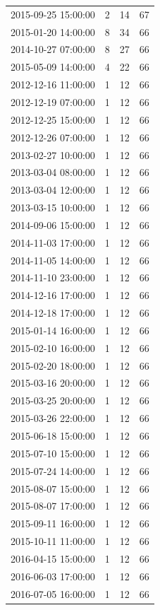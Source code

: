 \begin{tabular}{lrrr}
2015-09-25 15:00:00 & 2 & 14 & 67 \\
2015-01-20 14:00:00 & 8 & 34 & 66 \\
2014-10-27 07:00:00 & 8 & 27 & 66 \\
2015-05-09 14:00:00 & 4 & 22 & 66 \\
2012-12-16 11:00:00 & 1 & 12 & 66 \\
2012-12-19 07:00:00 & 1 & 12 & 66 \\
2012-12-25 15:00:00 & 1 & 12 & 66 \\
2012-12-26 07:00:00 & 1 & 12 & 66 \\
2013-02-27 10:00:00 & 1 & 12 & 66 \\
2013-03-04 08:00:00 & 1 & 12 & 66 \\
2013-03-04 12:00:00 & 1 & 12 & 66 \\
2013-03-15 10:00:00 & 1 & 12 & 66 \\
2014-09-06 15:00:00 & 1 & 12 & 66 \\
2014-11-03 17:00:00 & 1 & 12 & 66 \\
2014-11-05 14:00:00 & 1 & 12 & 66 \\
2014-11-10 23:00:00 & 1 & 12 & 66 \\
2014-12-16 17:00:00 & 1 & 12 & 66 \\
2014-12-18 17:00:00 & 1 & 12 & 66 \\
2015-01-14 16:00:00 & 1 & 12 & 66 \\
2015-02-10 16:00:00 & 1 & 12 & 66 \\
2015-02-20 18:00:00 & 1 & 12 & 66 \\
2015-03-16 20:00:00 & 1 & 12 & 66 \\
2015-03-25 20:00:00 & 1 & 12 & 66 \\
2015-03-26 22:00:00 & 1 & 12 & 66 \\
2015-06-18 15:00:00 & 1 & 12 & 66 \\
2015-07-10 15:00:00 & 1 & 12 & 66 \\
2015-07-24 14:00:00 & 1 & 12 & 66 \\
2015-08-07 15:00:00 & 1 & 12 & 66 \\
2015-08-07 17:00:00 & 1 & 12 & 66 \\
2015-09-11 16:00:00 & 1 & 12 & 66 \\
2015-10-11 11:00:00 & 1 & 12 & 66 \\
2016-04-15 15:00:00 & 1 & 12 & 66 \\
2016-06-03 17:00:00 & 1 & 12 & 66 \\
2016-07-05 16:00:00 & 1 & 12 & 66 \\

\end{tabular}
